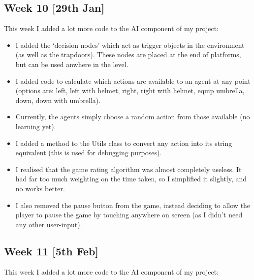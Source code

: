 \documentclass[a4paper,oneside]{report}
\begin{document}
\subsection{Week 10 [29th Jan]}

This week I added a lot more code to the AI component of my project:

\begin{itemize} 

\item I added the `decision nodes' which act as trigger objects in the environment (as well as the trapdoors). These nodes are placed at the end of platforms, but can be used anwhere in the level.

\item I added code to calculate which actions are available to an agent at any point (options are: left, left with helmet, right, right with helmet, equip umbrella, down, down with umbrella).

\item Currently, the agents simply choose a random action from those available (no learning yet).

\item I added a method to the Utils class to convert any action into its string equivalent (this is used for debugging purposes).

\item I realised that the game rating algorithm was almost completely useless. It had far too much weighting on the time taken, so I simplified it slightly, and no works better.

\item I also removed the pause button from the game, instead deciding to allow the player to pause the game by touching anywhere on screen (as I didn't need any other user-input).

\end{itemize}


\subsection{Week 11 [5th Feb]}

This week I added a lot more code to the AI component of my project:
\end{document}
